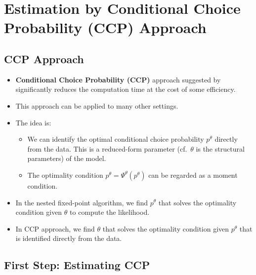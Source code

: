 \documentclass[
]{book}
\providecommand{\tightlist}{%
  \setlength{\itemsep}{0pt}\setlength{\parskip}{0pt}}
\begin{document}
\hypertarget{estimation-by-conditional-choice-probability-ccp-approach}{%
\section{Estimation by Conditional Choice Probability (CCP) Approach}\label{estimation-by-conditional-choice-probability-ccp-approach}}

\hypertarget{ccp-approach}{%
\subsection{CCP Approach}\label{ccp-approach}}

\begin{itemize}
\tightlist
\item
  \textbf{Conditional Choice Probability (CCP)} approach suggested by \citet{hotzConditionalChoiceProbabilities1993} significantly reduces the computation time at the cost of some efficiency.
\item
  This approach can be applied to many other settings.
\item
  The idea is:

  \begin{itemize}
  \tightlist
  \item
    We can identify the optimal conditional choice probability \(p^\theta\) directly from the data. This is a reduced-form parameter (cf.~\(\theta\) is the structural parameters) of the model.
  \item
    The optimality condition \(p^\theta = \Psi^\theta(p^\theta)\) can be regarded as a moment condition.
  \end{itemize}
\item
  In the nested fixed-point algorithm, we find \(p^\theta\) that solves the optimality condition given \(\theta\) to compute the likelihood.
\item
  In CCP approach, we find \(\theta\) that solves the optimality condition given \(p^\theta\) that is identified directly from the data.
\end{itemize}

\hypertarget{first-step-estimating-ccp}{%
\subsection{First Step: Estimating CCP}\label{first-step-estimating-ccp}}
\end{document}
